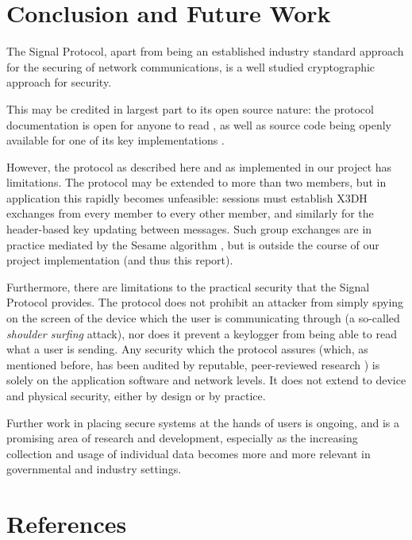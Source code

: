 \documentclass[12pt]{article}
\begin{document}
\section{Conclusion and Future Work}
The Signal Protocol, apart from being an established industry standard approach for the securing of network communications, is a well studied cryptographic approach for security. \parencite{formalAnalysisSig}\parencite{autoFormalAnalysisSig}
\par This may be credited in largest part to its open source nature: the protocol documentation is open for anyone to read \parencite{website:signal-docs}, as well as source code being openly available for one of its key implementations \parencite{website:sigOpenSource}. 
\par However, the protocol as described here and as implemented in our project has limitations. The protocol may be extended to more than two members, but in application this rapidly becomes unfeasible: sessions must establish X3DH exchanges from every member to every other member, and similarly for the header-based key updating between messages. Such group exchanges are in practice mediated by the Sesame algorithm \parencite{website:sigSesame}, but is outside the course of our project implementation (and thus this report).
\par Furthermore, there are limitations to the practical security that the Signal Protocol provides. The protocol does not prohibit an attacker from simply spying on the screen of the device which the user is communicating through (a so-called \textit{shoulder surfing} attack), nor does it prevent a keylogger from being able to read what a user is sending. Any security which the protocol assures (which, as mentioned before, has been audited by reputable, peer-reviewed research \parencite{formalAnalysisSig}\parencite{autoFormalAnalysisSig}) is solely on the application software and network levels. It does not extend to device and physical security, either by design or by practice.
\par Further work in placing secure systems at the hands of users is ongoing, and is a promising area of research and development, especially as the increasing collection and usage of individual data becomes more and more relevant in governmental and industry settings.




\newpage
\section{References}
\printbibliography
\end{document}
